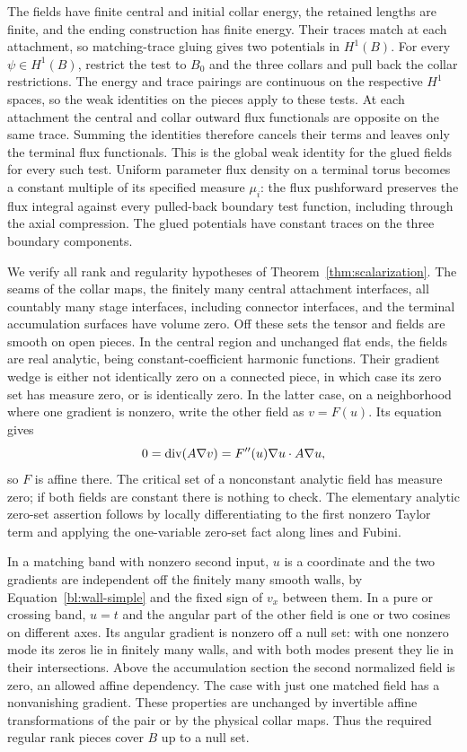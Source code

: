 The fields have finite central and initial collar energy, the retained
lengths are finite, and the ending construction has finite energy.
Their traces match at each attachment, so matching-trace gluing gives
two potentials in $H^1(B)$.  For every $\psi\in H^1(B)$, restrict the
test to $B_0$ and the three collars and pull back the collar restrictions.
The energy and trace pairings are continuous on the respective $H^1$
spaces, so the weak identities on the pieces apply to these tests.
At each attachment the central and collar outward flux functionals are
opposite on the same trace.  Summing the identities therefore cancels
their terms and leaves only the terminal flux functionals.  This is the
global weak identity for the glued fields for every such test.
Uniform parameter flux density on a terminal torus becomes a constant
multiple of its specified measure $\mu_i$: the flux pushforward preserves
the flux integral against every pulled-back boundary test function,
including through the axial compression.  The glued potentials have
constant traces on the three boundary components.

We verify all rank and regularity hypotheses of
Theorem~\ref{thm:scalarization}.  The seams of the collar maps, the
finitely many central attachment interfaces, all countably many stage
interfaces, including connector interfaces, and the terminal accumulation
surfaces have volume zero.  Off these sets the tensor and fields are
smooth on open pieces.  In the central region and unchanged flat ends,
the fields are real analytic, being constant-coefficient harmonic functions.  Their
gradient wedge is either not identically zero on a connected piece,
in which case its zero set has measure zero, or is identically zero.
In the latter case, on a neighborhood where one gradient is nonzero,
write the other field as $v=F(u)$.  Its equation gives
\[
 0=\operatorname{div}(A\nabla v)=F''(u)\nabla u\cdot A\nabla u,
\]
so $F$ is affine there.  The critical set of a nonconstant analytic
field has measure zero; if both fields are constant there is nothing
to check.  The elementary analytic zero-set assertion follows by
locally differentiating to the first nonzero Taylor term and applying
the one-variable zero-set fact along lines and Fubini.

In a matching band with nonzero second input, $u$ is a coordinate and
the two gradients are independent off the finitely many smooth walls, by
Equation~\eqref{bl:wall-simple} and the fixed sign of $v_x$ between them.
In a pure or crossing band, $u=t$ and the angular part of the other
field is one or two cosines on different axes.  Its angular gradient
is nonzero off a null set: with one nonzero mode its zeros lie in
finitely many walls, and with both modes present they lie in their
intersections.  Above the accumulation section the second normalized
field is zero, an allowed affine dependency.  The case with just one
matched field has a nonvanishing gradient.  These properties are
unchanged by invertible affine transformations of the pair or by the
physical collar maps.  Thus the required regular rank pieces cover
$B$ up to a null set.

